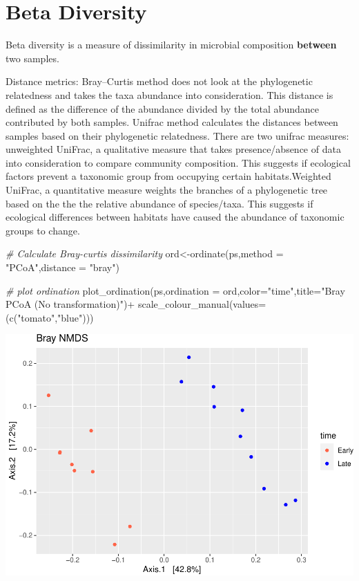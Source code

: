 \documentclass[
]{book}
\newenvironment{Shaded}{\begin{snugshade}}{\end{snugshade}}
\newcommand{\AttributeTok}[1]{\textcolor[rgb]{0.77,0.63,0.00}{#1}}
\newcommand{\CommentTok}[1]{\textcolor[rgb]{0.56,0.35,0.01}{\textit{#1}}}
\newcommand{\FunctionTok}[1]{\textcolor[rgb]{0.00,0.00,0.00}{#1}}
\newcommand{\NormalTok}[1]{#1}
\newcommand{\OtherTok}[1]{\textcolor[rgb]{0.56,0.35,0.01}{#1}}
\newcommand{\SpecialCharTok}[1]{\textcolor[rgb]{0.00,0.00,0.00}{#1}}
\newcommand{\StringTok}[1]{\textcolor[rgb]{0.31,0.60,0.02}{#1}}
\begin{document}
\hypertarget{beta-diversity}{%
\section{Beta Diversity}\label{beta-diversity}}

Beta diversity is a measure of dissimilarity in microbial composition \textbf{between} two samples.

Distance metrics: Bray--Curtis method does not look at the phylogenetic relatedness and takes the taxa abundance into consideration. This distance is defined as the difference of the abundance divided by the total abundance contributed by both samples. Unifrac method calculates the distances between samples based on their phylogenetic relatedness. There are two unifrac measures: unweighted UniFrac, a qualitative measure that takes presence/absence of data into consideration to compare community composition. This suggests if ecological factors prevent a taxonomic group from occupying certain habitats.Weighted UniFrac, a quantitative measure weights the branches of a phylogenetic tree based on the the the relative abundance of species/taxa. This suggests if ecological differences between habitats have caused the abundance of taxonomic groups to change.

\begin{Shaded}
\begin{Highlighting}[]
\CommentTok{\# Calculate Bray{-}curtis dissimilarity}
\NormalTok{ord}\OtherTok{\textless{}{-}}\FunctionTok{ordinate}\NormalTok{(ps,}\AttributeTok{method =} \StringTok{"PCoA"}\NormalTok{,}\AttributeTok{distance =} \StringTok{"bray"}\NormalTok{)}

\CommentTok{\# plot ordination}
\FunctionTok{plot\_ordination}\NormalTok{(ps,}\AttributeTok{ordination =}\NormalTok{ ord,}\AttributeTok{color=}\StringTok{"time"}\NormalTok{,}\AttributeTok{title=}\StringTok{"Bray PCoA (No transformation)"}\NormalTok{)}\SpecialCharTok{+} \FunctionTok{scale\_colour\_manual}\NormalTok{(}\AttributeTok{values=}\NormalTok{(}\FunctionTok{c}\NormalTok{(}\StringTok{"tomato"}\NormalTok{,}\StringTok{"blue"}\NormalTok{)))}
\end{Highlighting}
\end{Shaded}

\includegraphics{16sworkshop_files/figure-latex/unnamed-chunk-3-1.pdf}
\end{document}
